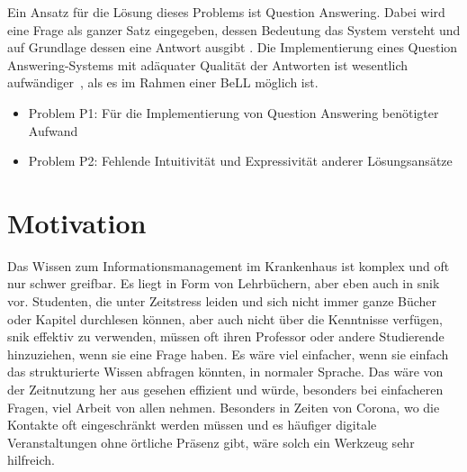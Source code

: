 Ein Ansatz für die Lösung dieses Problems ist Question Answering.
Dabei wird eine Frage als ganzer Satz eingegeben, dessen Bedeutung das System versteht und auf Grundlage dessen eine Antwort ausgibt \citep{qadefinition}.
Die Implementierung eines Question Answering-Systems mit adäquater Qualität der Antworten ist wesentlich aufwändiger~\citep[S.~3]{qanswer}, als es im Rahmen einer BeLL möglich ist.

\begin{itemize}
	\item Problem P1: Für die Implementierung von Question Answering benötigter Aufwand
	\item Problem P2: Fehlende Intuitivität und Expressivität anderer Lösungsansätze
\end{itemize}

\section{Motivation}
Das Wissen zum Informationsmanagement im Krankenhaus ist komplex und oft nur schwer greifbar.
Es liegt in Form von Lehrbüchern, aber eben auch in \acs{snik} vor.
Studenten, die unter Zeitstress leiden und sich nicht immer ganze Bücher oder Kapitel durchlesen können, aber auch nicht über die Kenntnisse verfügen, \acs{snik} effektiv zu verwenden,
müssen oft ihren Professor oder andere Studierende hinzuziehen, wenn sie eine Frage haben.
Es wäre viel einfacher, wenn sie einfach das strukturierte Wissen abfragen könnten, in normaler Sprache.
Das wäre von der Zeitnutzung her aus gesehen effizient und würde, besonders bei einfacheren Fragen, viel Arbeit von allen nehmen.
Besonders in Zeiten von Corona, wo die Kontakte oft eingeschränkt werden müssen und es häufiger digitale Veranstaltungen ohne örtliche Präsenz gibt, wäre solch ein Werkzeug sehr hilfreich.

